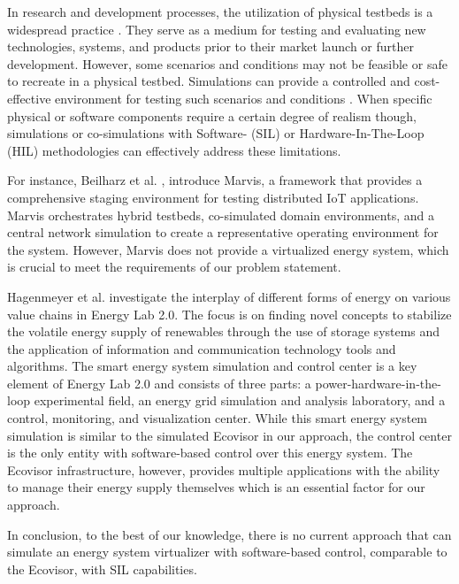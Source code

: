 In research and development processes, the utilization of physical testbeds is a
widespread practice \cite{cintuglu2017, mambretti2015}. They serve as a medium
for testing and evaluating new technologies, systems, and products prior to
their market launch or further development. However, some scenarios and
conditions may not be feasible or safe to recreate in a physical testbed.
Simulations can provide a controlled and cost-effective environment for testing
such scenarios and conditions \cite{mansouri2020}. When specific physical or
software components require a certain degree of realism though, simulations or
co-simulations with Software- (SIL) or Hardware-In-The-Loop (HIL) methodologies
can effectively address these limitations.

For instance, Beilharz et al. \cite{beilharz2021}, introduce Marvis, a framework
that provides a comprehensive staging environment for testing distributed IoT
applications. Marvis orchestrates hybrid testbeds, co-simulated domain
environments, and a central network simulation to create a representative
operating environment for the system. However, Marvis does not provide a
virtualized energy system, which is crucial to meet the requirements of our
problem statement.

Hagenmeyer et al. \cite{hagenmeyer2016} investigate the interplay of different
forms of energy on various value chains in Energy Lab 2.0. The focus is on
finding novel concepts to stabilize the volatile energy supply of renewables
through the use of storage systems and the application of information and
communication technology tools and algorithms. The smart energy system
simulation and control center is a key element of Energy Lab 2.0 and consists of
three parts: a power-hardware-in-the-loop experimental field, an energy grid
simulation and analysis laboratory, and a control, monitoring, and visualization
center. While this smart energy system simulation is similar to the simulated
Ecovisor in our approach, the control center is the only entity with
software-based control over this energy system. The Ecovisor infrastructure,
however, provides multiple applications with the ability to manage their energy
supply themselves which is an essential factor for our approach.

In conclusion, to the best of our knowledge, there is no current approach that
can simulate an energy system virtualizer with software-based control,
comparable to the Ecovisor, with SIL capabilities.
